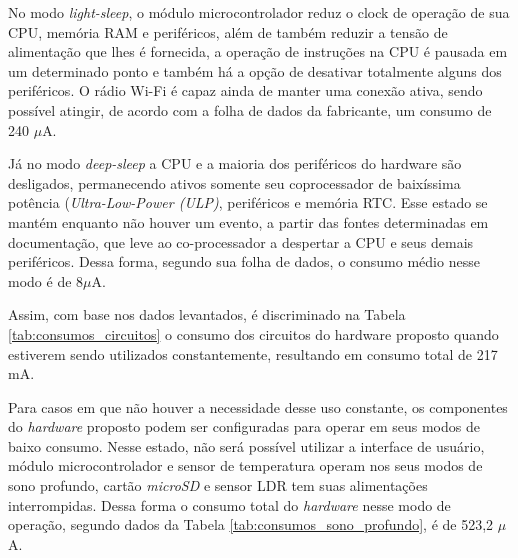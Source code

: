 No modo \textit{light-sleep}, o módulo microcontrolador reduz o clock de operação de sua CPU, memória RAM e periféricos, além de também reduzir a tensão de alimentação que lhes é fornecida, a operação de instruções na CPU é pausada em um determinado ponto e também há a opção de desativar totalmente alguns dos periféricos. O rádio Wi-Fi é capaz ainda de manter uma conexão ativa, sendo possível atingir, de acordo com a folha de dados da fabricante, um consumo de 240 $\mu$A. 

Já no modo \textit{deep-sleep} a CPU e a maioria dos periféricos do hardware são desligados, permanecendo ativos somente seu coprocessador de baixíssima potência (\textit{Ultra-Low-Power (ULP)}, periféricos e memória RTC. Esse estado se mantém enquanto não houver um evento, a partir das fontes determinadas em documentação, que leve ao co-processador a despertar a CPU e seus demais periféricos. Dessa forma, segundo sua folha de dados, o consumo médio nesse modo é de 8$\mu$A.

Assim, com base nos dados levantados, é discriminado na Tabela \ref{tab:consumos_circuitos} o consumo dos circuitos do hardware proposto quando estiverem sendo utilizados constantemente, resultando em consumo total de 217 mA. 

	\begin{table}[!h]
	\captionsetup{width=9cm}%
    \end{table}
    \newpage
    Para casos em que não houver a necessidade desse uso constante, os componentes do \textit{hardware} proposto podem ser configuradas para operar em seus modos de baixo consumo. Nesse estado, não será possível utilizar a interface de usuário, módulo microcontrolador e sensor de temperatura operam nos seus modos de sono profundo, cartão \textit{microSD} e sensor \gls{LDR} tem suas alimentações interrompidas. Dessa forma o consumo total do \textit{hardware} nesse modo de operação, segundo dados da Tabela \ref{tab:consumos_sono_profundo}, é de 523,2 $\mu$A.
    
